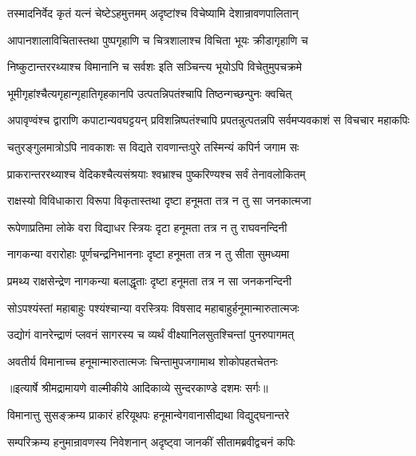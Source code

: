 \twolineshloka
{तस्मादनिर्वेद कृतं यत्नं चेष्टेऽहमुत्तमम्}
{अदृष्टांश्च विचेष्यामि देशान्रावणपालितान्} %

\twolineshloka
{आपानशालाविचितास्तथा पुष्पगृहाणि च}
{चित्रशालाश्च विचिता भूयः क्रीडागृहाणि च} %

\twolineshloka
{निष्कुटान्तररथ्याश्च विमानानि च सर्वशः}
{इति सञ्चिन्त्य भूयोऽपि विचेतुमुपचक्रमे} %

\twolineshloka
{भूमीगृहांश्चैत्यगृहान्गृहातिगृहकानपि}
{उत्पतन्निपतंश्चापि तिष्ठन्गच्छन्पुनः क्वचित्} %

\threelineshloka
{अपावृण्वंश्च द्वाराणि कपाटान्यवघट्टयन्}
{प्रविशन्निष्पतंश्चापि प्रपतन्नुत्पतन्नपि}
{सर्वमप्यवकाशं स विचचार महाकपिः} %

\twolineshloka
{चतुरङ्गुलमात्रोऽपि नावकाशः स विद्यते}
{रावणान्तःपुरे तस्मिन्यं कपिर्न जगाम सः} %

\twolineshloka
{प्राकरान्तररथ्याश्च वेदिकश्चैत्यसंश्रयाः}
{श्वभ्राश्च पुष्करिण्यश्च सर्वं तेनावलोकितम्} %

\twolineshloka
{राक्षस्यो विविधाकारा विरूपा विकृतास्तथा}
{दृष्टा हनूमता तत्र न तु सा जनकात्मजा} %

\twolineshloka
{रूपेणाप्रतिमा लोके वरा विद्याधर स्त्रियः}
{दृटा हनूमता तत्र न तु राघवनन्दिनी} %

\twolineshloka
{नागकन्या वरारोहाः पूर्णचन्द्रनिभाननाः}
{दृष्टा हनूमता तत्र न तु सीता सुमध्यमा} %

\twolineshloka
{प्रमथ्य राक्षसेन्द्रेण नागकन्या बलाद्धृताः}
{दृष्टा हनूमता तत्र न सा जनकनन्दिनी} %

\twolineshloka
{सोऽपश्यंस्तां महाबाहुः पश्यंश्चान्या वरस्त्रियः}
{विषसाद महाबाहुर्हनूमान्मारुतात्मजः} %

\twolineshloka
{उद्योगं वानरेन्द्राणं प्लवनं सागरस्य च}
{व्यर्थं वीक्ष्यानिलसुतश्चिन्तां पुनरुपागमत्} %

\twolineshloka
{अवतीर्य विमानाच्च हनूमान्मारुतात्मजः}
{चिन्तामुपजगामाथ शोकोपहतचेतनः} %


{॥इत्यार्षे श्रीमद्रामायणे वाल्मीकीये आदिकाव्ये सुन्दरकाण्डे दशमः सर्गः॥}


\twolineshloka
{विमानात्तु सुसङ्क्रम्य प्राकारं हरियूथपः}
{हनूमान्वेगवानासीद्यथा विद्युद्घनान्तरे} %

\twolineshloka
{सम्परिक्रम्य हनुमान्रावणस्य निवेशनान्}
{अदृष्ट्वा जानकीं सीतामब्रवीद्वचनं कपिः} %

